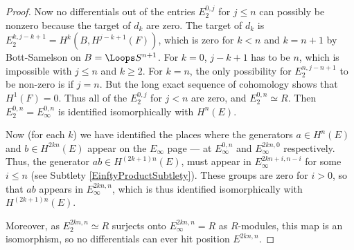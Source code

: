 \begin{proof}
Now no differentials out of the entries $E_2^{0,j}$ for $j\leq n$ can possibly be nonzero because the target of $d_k $ are zero.
The target of $d_k $ is $E_{2}^{k,j-k+1}  = H^{k}(B,H^{j-k+1}(F))   $, which is zero for $k < n $ and $k=n+1 $ by Bott-Samelson on $B=\Loops S^{n+1}  $.
For $k=0 $, $j-k+1 $ has to be $n $, which is impossible with $j \le n $ and $k \ge 2 $.
For $k=n $, the only possibility for $E_{2}^{n,j-n+1}  $ to be non-zero is if $j=n $.
But the long exact sequence of cohomology shows that $H^{1}(F)=0  $.
Thus all of the $E_2^{0,j}$ for $j<n$ are zero, and $E_2^{0,n}\simeq R$. 
Then $E_2^{0,n}=E_\infty^{0,n}$ is identified isomorphically with $H^n(E)$.

Now (for each $k$) we have identified the places where the generators $a\in H^n(E)$ and $b\in H^{2kn}(E)$ appear on the $E_{\infty}$ page --- at $E_\infty^{0,n}$ and $E_\infty^{2kn,0}$ respectively. Thus, the generator $ab\in H^{(2k+1)n}(E)$, must appear in $E_{\infty}^{2kn+i,n-i}$ for some $i\leq n$ (see Subtlety \ref{EinftyProductSubtlety}).
These groups are zero for $i>0$, so that $ab$ appears in $E_{\infty}^{2kn,n}$, which is thus identified isomorphically with $H^{(2k+1)n}(E)$.

Moreover, as $E_2^{2kn,n}\simeq R$ surjects onto $E_\infty^{2kn,n}=R$ as $R$-modules, this map is an isomorphism, so no differentials can ever hit position $E^{2kn,n}$.

%


\end{proof}
